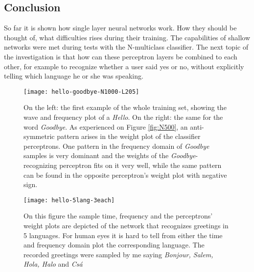 \subsection{Conclusion}
So far it is shown how single layer neural networks work. How they should be thought of, what difficulties rises during their training. The capabilities of shallow networks were met during tests with the N-multiclass classifier. The next topic of the investigation is that how can these perceptron layers be combined to each other, for example to recognize whether a user said yes or no, without explicitly telling  which language he or she was speaking.

\begin{figure}
	\centering
	\texttt{[image: hello-goodbye-N1000-L205]}
	\caption{On the left: the first example of the whole training set, showing the wave and frequency plot of a \emph{Hello}. On the right: the same for the word \emph{Goodbye}. As experienced on Figure \ref{fig:N500}, an anti-symmetric pattern arises in the weight plot of the classifier perceptrons. One pattern in the frequency domain of \emph{Goodbye} samples is very dominant and the weights of the \emph{Goodbye}-recognizing perceptron fits on it very well, while the same pattern can be found in the opposite perceptron's weight plot with negative sign.}
	
	\label{fig:hello}
\end{figure}

\begin{figure}
	\centering
	\texttt{[image: hello-5lang-3each]}
	\caption{On this figure the sample time, frequency and the perceptrons' weight plots are depicted of the network that recognizes greetings in 5 languages. For human eyes it is hard to tell from either the time and frequency domain plot the corresponding language. The recorded greetings were sampled by me saying \emph{Bonjour, Salem, Hola, Halo} and \emph{Csá}}
	
	\label{fig:hello5}
\end{figure}

